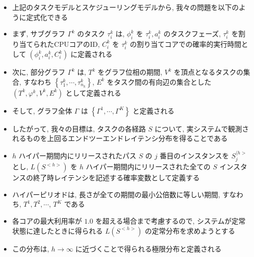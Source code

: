 \begin{frame}{}
    \begin{itemize}
        \item 上記のタスクモデルとスケジューリングモデルから, 我々の問題を以下のように定式化できる
        \item まず, サブグラフ $\Gamma^{k}$ のタスク $\tau_{i}^{k}$ は, $\phi_{i}^{k}$ を $\tau_{i}^{k}, a_{i}^{k}$ のタスクフェーズ, $\tau_{i}^{k}$ を割り当てられたCPUコアのID, $C_{i}^{k}$ を $\tau_{i}^{k}$ の割り当てコアでの確率的実行時間として $\left(\phi_{i}^{k}, a_{i}^{k}, C_{i}^{k}\right)$ に定義される
        \item 次に, 部分グラフ $\Gamma^{k}$ は, $T^{k}$ をグラフ位相の期間, $V^{k}$ を頂点となるタスクの集合, すなわち $\left\{\tau_{1}^{k}, \cdots, \tau_{n_{k}}^{k}\right\}$, $E^{k}$ をタスク間の有向辺の集合とした $\left(T^{k}, \varphi^{k}, V^{k}, E^{k}\right)$ として定義される
    \end{itemize}
\end{frame}

\begin{frame}{}
    \begin{itemize}
        \item そして, グラフ全体 $\Gamma$ は $\left\{\Gamma^{1}, \cdots, \Gamma^{K}\right\}$ と定義される
        \item したがって, 我々の目標は, タスクの各経路 $S$ について, 実システムで観測されるものを上回るエンドツーエンドレイテンシ分布を得ることである
        \item $h$ ハイパー期間内にリリースされたパス $S$ の $j$ 番目のインスタンスを $S_{j}^{\langle h>}$ とし, $L\left(S^{<h>}\right)$ を $h$ ハイパー期間内にリリースされた全ての $S$ インスタンスの終了時レイテンシを記述する確率変数として定義する
        \item ハイパーピリオドは, 長さが全ての期間の最小公倍数に等しい期間, すなわち, $T^{1}, T^{2}, \cdots$, $T^{K}$ である
        \item 各コアの最大利用率が $1.0$ を超える場合まで考慮するので, システムが定常状態に達したときに得られる $L\left(S^{<h>}\right)$ の定常分布を求めようとする
        \item この分布は, $h \rightarrow \infty$ に近づくことで得られる極限分布と定義される
    \end{itemize}
\end{frame}
